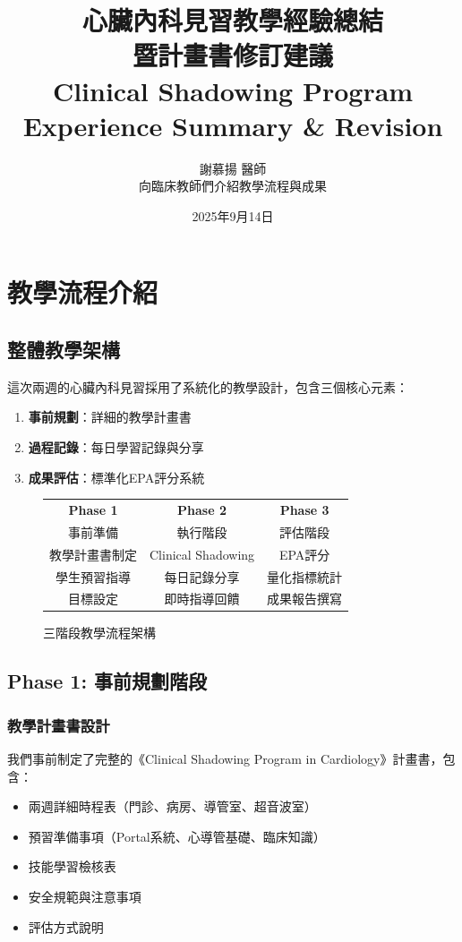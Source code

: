 \documentclass[12pt,a4paper]{article}
\title{\Large \textbf{心臟內科見習教學經驗總結}\\
\large \textbf{暨計畫書修訂建議}\\
\normalsize Clinical Shadowing Program Experience Summary \& Revision}
\author{謝慕揚 醫師\\
向臨床教師們介紹教學流程與成果}
\date{2025年9月14日}
\begin{document}
\maketitle

\section{教學流程介紹}

\subsection{整體教學架構}

這次兩週的心臟內科見習採用了系統化的教學設計，包含三個核心元素：

\begin{enumerate}
\item \textbf{事前規劃}：詳細的教學計畫書
\item \textbf{過程記錄}：每日學習記錄與分享
\item \textbf{成果評估}：標準化EPA評分系統
\end{enumerate}

\begin{figure}[h]
\centering
\begin{tabular}{|c|c|c|}
\hline
\textbf{Phase 1} & \textbf{Phase 2} & \textbf{Phase 3} \\
事前準備 & 執行階段 & 評估階段 \\
\hline
教學計畫書制定 & Clinical Shadowing & EPA評分 \\
學生預習指導 & 每日記錄分享 & 量化指標統計 \\
目標設定 & 即時指導回饋 & 成果報告撰寫 \\
\hline
\end{tabular}
\caption{三階段教學流程架構}
\end{figure}

\subsection{Phase 1: 事前規劃階段}

\subsubsection{教學計畫書設計}
我們事前制定了完整的《Clinical Shadowing Program in Cardiology》計畫書，包含：

\begin{itemize}
\item 兩週詳細時程表（門診、病房、導管室、超音波室）
\item 預習準備事項（Portal系統、心導管基礎、臨床知識）
\item 技能學習檢核表
\item 安全規範與注意事項
\item 評估方式說明
\end{itemize}
\end{document}
